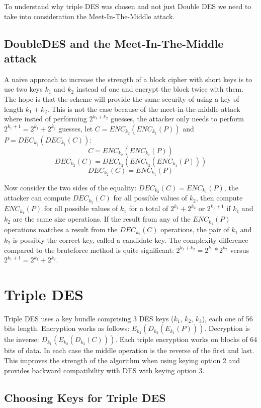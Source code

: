 To understand why triple DES was chosen and not just Double DES we need to take into consideration the Meet-In-The-Middle attack. 

\subsection{DoubleDES and the Meet-In-The-Middle attack}

A naive approach to increase the strength of a block cipher with short keys is to use two keys $k_1$ and $k_2$ instead of one and encrypt the block twice with them. The hope is that the scheme will provide the same security of using a key of length $k_1+k_2$. This is not the case because of the meet-in-the-middle attack where insted of performing $2^{k_1+k_2}$ guesses, the attacker only needs to perform $2^{k_1 + 1} = 2^{k_1} + 2^{k_2}$ guesses, let $C=ENC_{k_2}(ENC_{k_1}(P))$ and $P=DEC_{k_2}(DEC_{k_1}(C))$:
\[C=ENC_{k_2}(ENC_{k_1}(P))\]
\[DEC_{k_2}(C)=DEC_{k_2}(ENC_{k_2}(ENC_{k_1}(P)))\]
\[DEC_{k_2}(C)=ENC_{k_1}(P)\]

Now consider the two sides of the equality: $DEC_{k_2}(C)=ENC_{k_1}(P)$, the attacker can compute $DEC_{k_2}(C)$ for all possible values of $k_2$, then compute $ENC_{k_1}(P)$ for all possible values of $k_1$ for a total of $2^{k_1} + 2^{k_2}$ or $2^{k_1 + 1}$ if $k_1$ and $k_2$ are the same size operations. If the result from any of the $ENC_{k_1}(P)$ operations matches a result from the $DEC_{k_2}(C)$ operations, the pair of $k_1$ and $k_2$ is possibly the correct key, called a candidate key. The complexity difference compared to the bruteforce method is quite significant: $2^{k_1 + k_2} = 2^{k_1} * 2^{k_2}$ versus $2^{k_1 + 1} = 2^{k_1} + 2^{k_2}$.

\section{Triple DES}

Triple DES uses a key bundle comprising 3 DES keys ($k_1$, $k_2$, $k_3$), each one of 56 bits length. Encryption works as follows: 
$E_{k_3}(D_{k_2}(E_{k_1}(P)))$. Decryption is the inverse: $D_{k_1}(E_{k_2}(D_{k_3}(C)))$. Each triple encryption works on blocks of 64 bits of data.
In each case the middle operation is the reverse of the first and last. This improves the strength of the algorithm when using keying option 2 and provides backward compatibility with DES with keying option 3. 

\subsection{Choosing Keys for Triple DES}

